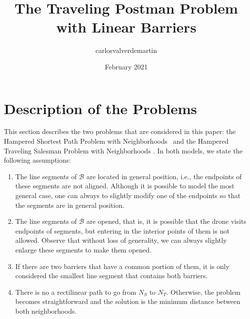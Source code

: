 \documentclass[a4paper]{elsarticle}
\title{The Traveling Postman Problem with Linear Barriers}
\author{carlosvalverdemartin }
\date{February 2021}
\newcommand{\SPPN}{{\sf{H-SPPN}\xspace }}
\newcommand{\TSPN}{{\sf{H-TSPN}\xspace }}
\newcommand{\JP}[1]{{\color{armygreen}#1}}
\begin{document}
	\section{Description of the Problems}\label{section:description}
	This section describes the two problems that are considered in this paper: the Hampered Shortest Path Problem with Neighborhoods \SPPN \ and the Hampered Traveling Salesman Problem with Neighborhoods \TSPN. In both models, we state the following assumptions:
	
	\begin{enumerate}[label=\textbf{A\arabic*},ref=\textbf{A\arabic*}]
		\item \label{A1}The line segments of $\mathcal B$ are located in general position, i.e., the endpoints of these segments are not aligned. Although it is possible to model the most general case, \JP{one can always to slightly modify one of the endpoints so that the segments are in general position.}
		\item The line segments of $\mathcal B$ are opened, that is, it is possible that the drone visits  endpoints of segments, but entering  in the interior points of them is not allowed. \JP{Observe that without loss of generality, we can always slightly enlarge these segments to make them opened.}
		\item If there are two barriers that have a common portion of them, it is only considered the smallest line segment that contains both barriers.
		\item \label{A4}There is no a rectilinear path to go from $N_S$ to $N_T$. Otherwise, the problem becomes straightforward and the solution is the minimum distance between both neighborhoods.
	\end{enumerate}
	
	
\end{document}

